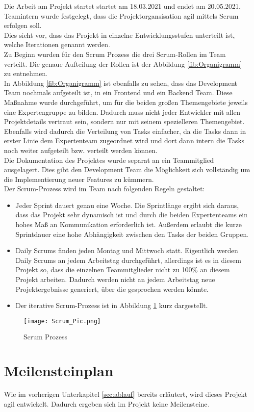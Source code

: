 \label{sec:ablauf}
Die Arbeit am Projekt startet startet am 18.03.2021 und endet am 20.05.2021. \\
Teamintern wurde festgelegt, dass die Projektorgansisation agil mittels \gls{Scrum} erfolgen soll.\\
Dies sieht vor, dass das Projekt in einzelne Entwicklungsstufen unterteilt ist, welche Iterationen genannt werden.\\
Zu Beginn wurden für den Scrum Prozess die drei Scrum-Rollen im Team verteilt. Die genaue Aufteilung der Rollen ist der Abbildung \ref{fib:Organigramm} zu entnehmen. \\
In Abbildung \ref{fib:Organigramm} ist ebenfalls zu sehen, dass das \gls{Development Team} nochmals aufgeteilt ist, in ein \gls{Frontend} und ein \gls{Backend} Team. Diese Maßnahme wurde durchgeführt, um für die beiden großen Themengebiete jeweils eine Expertengruppe zu bilden. Dadurch muss nicht jeder Entwickler mit allen Projektdetails vertraut sein, sondern nur mit seinem spezielleren Themengebiet. Ebenfalls wird dadurch die Verteilung von Tasks einfacher, da die Tasks dann in erster Linie dem Expertenteam zugeordnet wird und dort dann intern die Tasks noch weiter aufgeteilt bzw. verteilt werden können. \\
Die Dokumentation des Projektes wurde separat an ein Teammitglied ausgelagert. Dies gibt den \gls{Development Team} die Möglichkeit sich vollständig um die Implementierung neuer Features zu kümmern.\\
Der Scrum-Prozess wird im Team nach folgenden Regeln gestaltet:
\begin{itemize}
\item Jeder Sprint dauert genau eine Woche. Die Sprintlänge ergibt sich daraus, dass das Projekt sehr dynamisch ist und durch die beiden Expertenteams ein hohes Maß an Kommunikation erforderlich ist. Außerdem erlaubt die kurze Sprintdauer eine hohe Abhängigkeit zwischen den Tasks der beiden Gruppen.
\item \gls{Daily Scrum}s finden jeden Montag und Mittwoch statt. Eigentlich werden \gls{Daily Scrum}s an jedem Arbeitstag durchgeführt, allerdings ist es in diesem Projekt so, dass die einzelnen Teammitglieder nicht zu 100\% an diesem Projekt arbeiten. Dadurch werden nicht an jedem Arbeitstag neue Projektergebnisse generiert, über die gesprochen werden könnte. 
\item Der iterative Scrum-Prozess ist in Abbildung \ref{fib:Scrum} kurz dargestellt.
\end{itemize} 

\begin{figure}[h]
\centering
\texttt{[image: Scrum\_Pic.png]}
\caption{Scrum Prozess}
\label{fib:Scrum}
\end{figure}

\section{Meilensteinplan}

Wie im vorherigen Unterkapitel \ref{sec:ablauf} bereits erläutert, wird dieses Projekt agil entwickelt. Dadurch ergeben sich im Projekt keine Meilensteine.